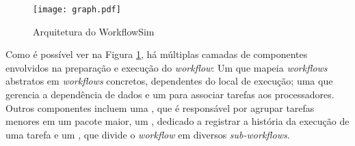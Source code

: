 \begin{figure}[ht]
\centering
\texttt{[image: graph.pdf]}
\caption{Arquitetura do WorkflowSim}
\label{fig:arquitetura_workflowsim}
\end{figure}

Como é possível ver na Figura \ref{fig:arquitetura_workflowsim}, há múltiplas 
camadas de componentes envolvidos na preparação e execução do \emph{workflow}:
Um  que mapeia \emph{workflows} abstratos em
\emph{workflows} concretos, dependentes do local de execução; uma  que gerencia a dependência de dados e um  para 
associar tarefas aos processadores. Outros componentes incluem uma , que é responsável por agrupar tarefas menores em um pacote maior, um
, dedicado a registrar a história da execução de uma
tarefa e um , que divide o \emph{workflow} em diversos
\emph{sub-workflows}. 

